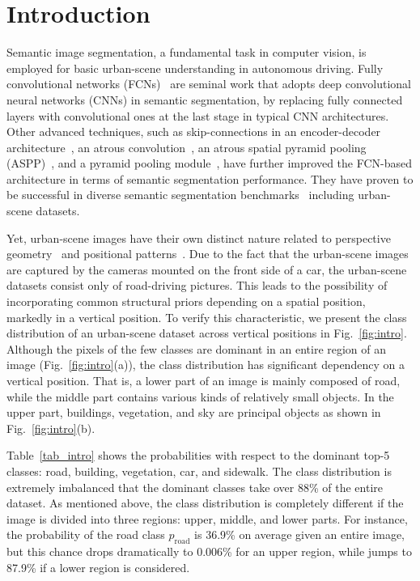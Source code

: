 \documentclass[10pt,twocolumn,letterpaper]{article}
\begin{document}
\section{Introduction} \label{sec:Intro}
\vspace{-0.1cm}
Semantic image segmentation, a fundamental task in computer vision, is employed for basic urban-scene understanding in autonomous driving. Fully convolutional networks (FCNs)~\cite{long2015fully} are 
seminal work that adopts deep convolutional neural networks (CNNs)
in semantic segmentation, by replacing fully connected layers with convolutional ones at the last stage in typical CNN architectures. Other advanced techniques, such as skip-connections in an encoder-decoder architecture~\cite{badrinarayanan2017segnet,ronneberger2015u,chen2018encoder}, an atrous convolution~\cite{chen2018deeplab, yu2015multi}, an atrous spatial pyramid pooling (ASPP)~\cite{chen2017rethinking}, and a pyramid pooling module~\cite{zhao2017pyramid}, have further improved the FCN-based architecture in terms of semantic segmentation performance. They have proven to be successful in diverse semantic segmentation benchmarks~\cite{everingham2010pascal,pascal-voc-2012,mottaghi2014role,cordts2016cityscapes,Alhaija2018IJCV,lin2014microsoft,neuhold2017mapillary} including urban-scene datasets.


Yet, urban-scene images have their own distinct nature related to perspective geometry~\cite{Li2017FoveaNetPU} and positional patterns~\cite{zou2018unsupervised,chen2018road}. Due to the fact that the urban-scene images are captured by the cameras mounted 
on the front side of a car, the urban-scene datasets consist only of road-driving pictures. This leads to the possibility of incorporating common structural priors depending on a spatial position, markedly 
in a vertical position. To verify this characteristic, we present the class distribution of an urban-scene dataset across vertical positions in Fig.~\ref{fig:intro}. Although the pixels of the few classes
are dominant in an entire region of an image (Fig.~\ref{fig:intro}(a)), the class distribution has significant dependency on a vertical position. That is, a lower part of an image is mainly composed of road, while 
the middle part contains various kinds of relatively small objects. In 
the upper part, buildings, vegetation, and sky are principal objects as shown in Fig.~\ref{fig:intro}(b).


Table~\ref{tab_intro} shows the probabilities with respect to the dominant top-5 classes: road, building, vegetation, car, and sidewalk. The class distribution is extremely imbalanced that the dominant classes take over 88\% of the entire dataset. As mentioned above, the class distribution is completely different if the image is divided into 
three regions: upper, middle, and lower parts. For instance, the probability of the road class $p_{\text{road}}$ is 36.9\% on average given an entire image, but this chance drops dramatically to 0.006\% for an upper region, while jumps to 87.9\% if a lower region is considered. 
\end{document}
